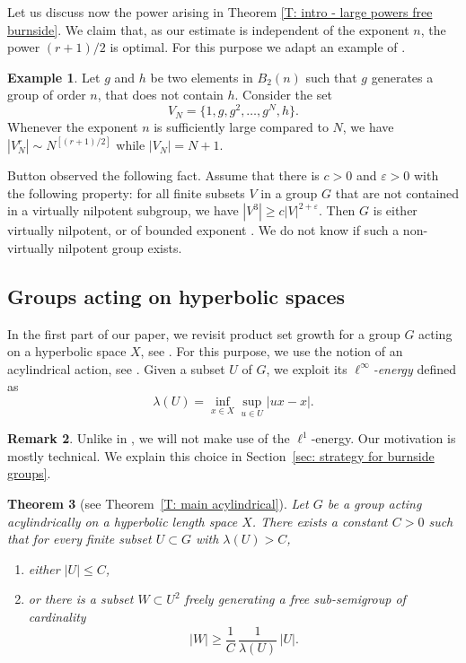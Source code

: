 \documentclass[11pt]{article}
\theoremstyle{plain}
\newtheorem{thm}{Theorem}[section]
\theoremstyle{definition}
\newtheorem{ex}[thm]{Example}
\newtheorem{rem}[thm]{Remark}
\begin{document}
Let us discuss now the power arising in Theorem \ref{T: intro - large powers free burnside}.
We claim that, as our estimate is independent of the exponent $n$, the power $(r+1)/2$ is optimal.
For this purpose we adapt an example of \cite{safin_powers_2011}.

\begin{ex} \label{E: optimal}
Let $g$ and $h$ be two elements in $B_2(n)$ such that $g$ generates a group of order $n$, that does not contain $h$.
Consider the set
\begin{equation*}
V_N=\{1, g, g^2 ,\ldots , g^N, h\}.
\end{equation*}
Whenever the exponent $n$ is sufficiently large compared to $N$, we have $|V_N^r|\sim N^{[(r+1)/2]}$ while $|V_N|=N+1$.
\end{ex}

Button observed the following fact.
Assume that there is $c>0$ and $\varepsilon>0$ with the following property: for all finite subsets $V$ in a group $G$ that are not contained in a virtually nilpotent subgroup, we have $|V^3|\geqslant c |V|^{2+\varepsilon}$.
Then $G$ is either virtually nilpotent, or of bounded exponent \cite[Prop.\,4.1]{button_explicit_2013}.
We do not know if such a non-virtually nilpotent group exists.

\subsection{Groups acting on hyperbolic spaces}
In the first part of our paper, we revisit product set growth for a group $G$ acting on a hyperbolic space $X$, see \cite[Th.\,1.14]{delzant_product_2020}. For this purpose, we use the notion of an acylindrical action, see \cite{sela_acylindricity_1997,bowditch_tight_2008}.
Given a subset $U$ of $G$, we exploit its \emph{$\ell^\infty$-energy} defined as
\begin{equation*}
\lambda(U) = \inf_{x \in X}\sup_{u \in U} |ux - x|.
\end{equation*}

\begin{rem}
Unlike in \cite{delzant_product_2020}, we will not make use of the $\ell^1$-energy.
Our motivation is mostly technical.
We explain this choice in Section~\ref{sec: strategy for burnside groups}.
\end{rem}

\begin{thm}[see Theorem~\ref{T: main acylindrical}]
\label{T: main acylindrical - intro}
Let $G$ be a group acting acylindrically on a hyperbolic length space $X$.
There exists a constant $C > 0$ such that for every finite subset $U\subset G$ with $\lambda(U)> C$,
\begin{enumerate}
\item either $\displaystyle |U| \leq C$,
\item or there is a subset $W\subset U^2$ freely generating a free sub-semigroup of cardinality
\begin{equation*}
|W| \geq \frac 1C\,\frac 1{\lambda(U)}\, |U|.
\end{equation*}
\end{enumerate}
\end{thm}
\end{document}
